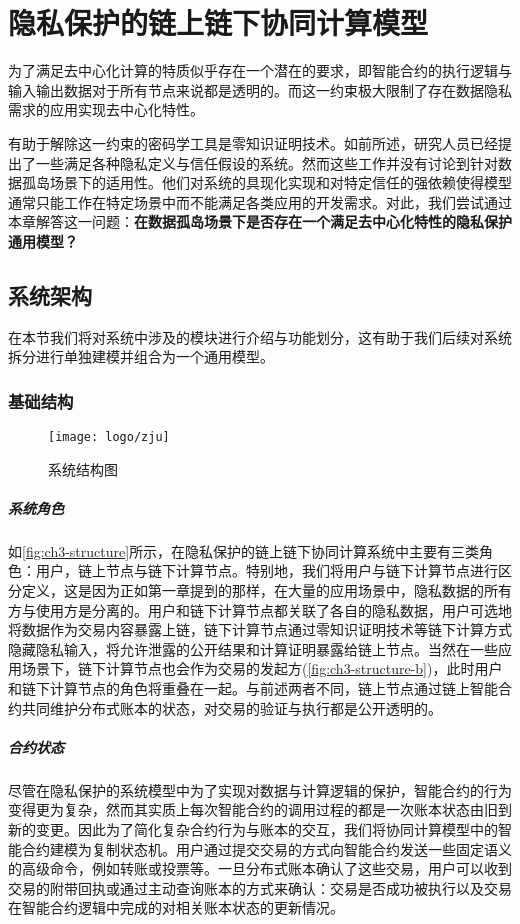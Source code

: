 \chapter{隐私保护的链上链下协同计算模型}

为了满足去中心化计算的特质似乎存在一个潜在的要求，即智能合约的执行逻辑与输入输出数据对于所有节点来说都是透明的。而这一约束极大限制了存在数据隐私需求的应用实现去中心化特性。

有助于解除这一约束的密码学工具是零知识证明技术。如前所述，研究人员已经提出了一些满足各种隐私定义与信任假设的系统\cite{//}。然而这些工作并没有讨论到针对数据孤岛场景下的适用性。他们对系统的具现化实现和对特定信任的强依赖使得模型通常只能工作在特定场景中而不能满足各类应用的开发需求。对此，我们尝试通过本章解答这一问题：\textbf{在数据孤岛场景下是否存在一个满足去中心化特性的隐私保护通用模型？}
\section{系统架构}
在本节我们将对系统中涉及的模块进行介绍与功能划分，这有助于我们后续对系统拆分进行单独建模并组合为一个通用模型。
\subsection{基础结构}
\begin{figure}[htbp]
    \centering
    \texttt{[image: logo/zju]}
    \caption{\label{fig:ch3-structure}系统结构图}
\end{figure}

\paragraph{系统角色}如\autoref{fig:ch3-structure}所示，在隐私保护的链上链下协同计算系统中主要有三类角色：用户，链上节点与链下计算节点。特别地，我们将用户与链下计算节点进行区分定义，这是因为正如第一章提到的那样，在大量的应用场景中，隐私数据的所有方与使用方是分离的。用户和链下计算节点都关联了各自的隐私数据，用户可选地将数据作为交易内容暴露上链，链下计算节点通过零知识证明技术等链下计算方式隐藏隐私输入，将允许泄露的公开结果和计算证明暴露给链上节点。当然在一些应用场景下，链下计算节点也会作为交易的发起方(\autoref{fig:ch3-structure-b})，此时用户和链下计算节点的角色将重叠在一起。与前述两者不同，链上节点通过链上智能合约共同维护分布式账本的状态，对交易的验证与执行都是公开透明的。

\paragraph{合约状态}尽管在隐私保护的系统模型中为了实现对数据与计算逻辑的保护，智能合约的行为变得更为复杂，然而其实质上每次智能合约的调用过程的都是一次账本状态由旧到新的变更。因此为了简化复杂合约行为与账本的交互，我们将协同计算模型中的智能合约建模为复制状态机。用户通过提交交易的方式向智能合约发送一些固定语义的高级命令，例如转账或投票等。一旦分布式账本确认了这些交易，用户可以收到交易的附带回执或通过主动查询账本的方式来确认：交易是否成功被执行以及交易在智能合约逻辑中完成的对相关账本状态的更新情况。

